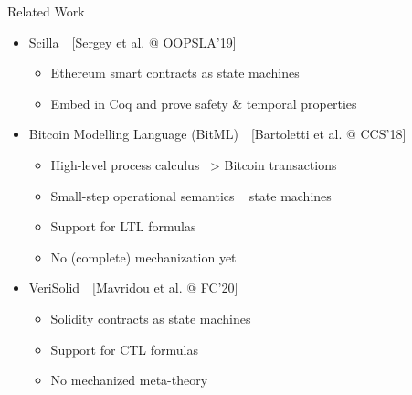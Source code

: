 \begin{frame}{Related Work}

\begin{itemize}
\item \alert{Scilla}~~[Sergey et al. @ OOPSLA'19]
  \begin{itemize}
  \item Ethereum smart contracts as state machines
  \item Embed in Coq and prove safety \& temporal properties
  \end{itemize}
\pause
\item \alert{Bitcoin Modelling Language (BitML)}~~[Bartoletti et al. @ CCS'18]
  \begin{itemize}
  \item High-level process calculus ~> Bitcoin transactions
  \item Small-step operational semantics ~ state machines
  \item Support for LTL formulas
  \item No (complete) mechanization yet
  \end{itemize}
\pause
\item \alert{VeriSolid}~~[Mavridou et al. @ FC'20]
  \begin{itemize}
  \item Solidity contracts as state machines
  \item Support for CTL formulas
  \item No mechanized meta-theory
  \end{itemize}
\end{itemize}

\end{frame}
